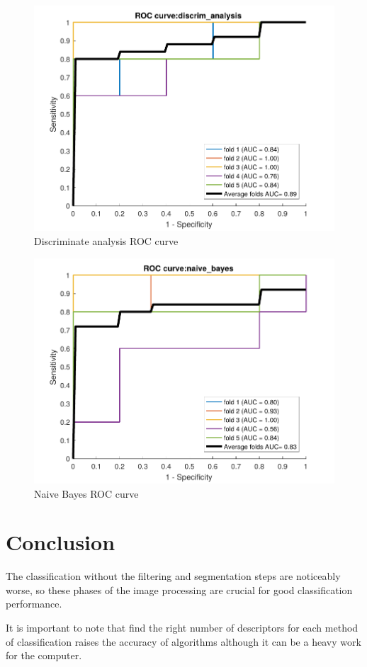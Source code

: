 \documentclass[conference]{IEEEtran}
\begin{document}
		\begin{figure}[!htp]
			\centering
			\includegraphics[width=0.7\linewidth]{images/results/discrim_analysisROC}
			\caption{Discriminate analysis ROC curve}
			\label{fig:discrimanalysisroc}
		\end{figure}
	
		\begin{figure}[!htp]
			\centering
			\includegraphics[width=0.7\linewidth]{images/results/naive_bayesROC}
			\caption{Naive Bayes ROC curve}
			\label{fig:naivebayesroc}
		\end{figure}

	\section{Conclusion}
		\par The classification without the filtering and segmentation steps are noticeably worse, so these phases of the image processing are crucial for good classification performance.
		\par It is important to note that find the right number of descriptors for each method of classification raises the accuracy of algorithms although it can be a heavy work for the computer.
	
	
	
\end{document}
